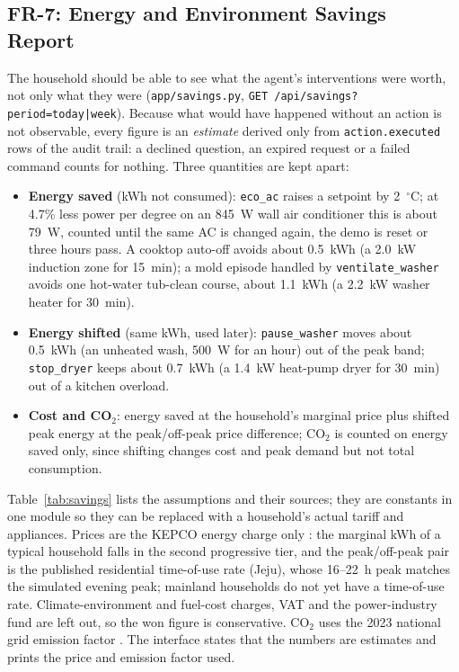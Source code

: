\documentclass[conference]{IEEEtran}
\begin{document}
\subsection{FR-7: Energy and Environment Savings Report}
The household should be able to see what the agent's interventions were worth, not only what they were (\texttt{app/savings.py}, \texttt{GET /api/savings?period=today|week}). Because what would have happened without an action is not observable, every figure is an \emph{estimate} derived only from \texttt{action.executed} rows of the audit trail: a declined question, an expired request or a failed command counts for nothing. Three quantities are kept apart:
\begin{itemize}
    \item \textbf{Energy saved} (kWh not consumed): \texttt{eco\_ac} raises a setpoint by 2~$^\circ$C; at 4.7\% less power per degree \cite{kea2017} on an 845~W wall air conditioner \cite{lgac2024} this is about 79~W, counted until the same AC is changed again, the demo is reset or three hours pass. A cooktop auto-off avoids about 0.5~kWh (a 2.0~kW induction zone \cite{lgcook2026} for 15~min); a mold episode handled by \texttt{ventilate\_washer} avoids one hot-water tub-clean course, about 1.1~kWh (a 2.2~kW washer heater \cite{lgwash2026} for 30~min).
    \item \textbf{Energy shifted} (same kWh, used later): \texttt{pause\_washer} moves about 0.5~kWh (an unheated wash, 500~W for an hour) out of the peak band; \texttt{stop\_dryer} keeps about 0.7~kWh (a 1.4~kW heat-pump dryer \cite{lgdry2026} for 30~min) out of a kitchen overload.
    \item \textbf{Cost and CO$_2$}: energy saved at the household's marginal price plus shifted peak energy at the peak/off-peak price difference; CO$_2$ is counted on energy saved only, since shifting changes cost and peak demand but not total consumption.
\end{itemize}
Table~\ref{tab:savings} lists the assumptions and their sources; they are constants in one module so they can be replaced with a household's actual tariff and appliances. Prices are the KEPCO energy charge only \cite{kepco2023}: the marginal kWh of a typical household falls in the second progressive tier, and the peak/off-peak pair is the published residential time-of-use rate (Jeju), whose 16--22~h peak matches the simulated evening peak; mainland households do not yet have a time-of-use rate. Climate-environment and fuel-cost charges, VAT and the power-industry fund are left out, so the won figure is conservative. CO$_2$ uses the 2023 national grid emission factor \cite{mcee2025}. The interface states that the numbers are estimates and prints the price and emission factor used.
\end{document}

